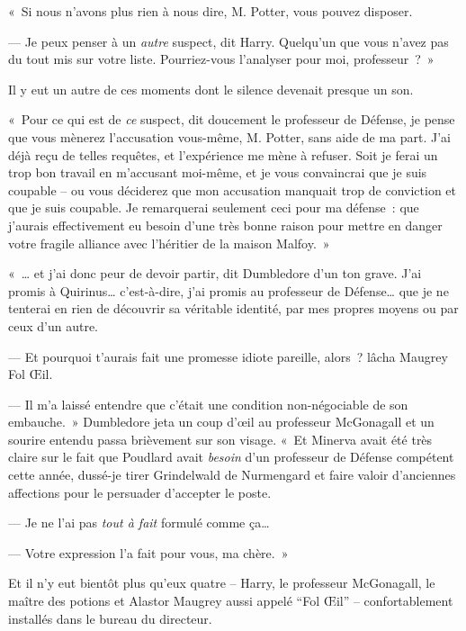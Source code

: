 «~Si nous n'avons plus rien à nous dire, M. Potter, vous pouvez disposer.

--- Je peux penser à un \emph{autre} suspect, dit Harry.
Quelqu'un que vous n'avez pas du tout mis sur votre liste.
Pourriez-vous l'analyser pour moi, professeur~?~»

Il y eut un autre de ces moments dont le silence devenait presque un son.

«~Pour ce qui est de \emph{ce} suspect, dit doucement le professeur de Défense, je pense que vous mènerez l'accusation vous-même, M. Potter, sans aide de ma part.
J'ai déjà reçu de telles requêtes, et l'expérience me mène à refuser.
Soit je ferai un trop bon travail en m'accusant moi-même, et je vous convaincrai que je suis coupable -- ou vous déciderez que mon accusation manquait trop de conviction et que je suis coupable.
Je remarquerai seulement ceci pour ma défense~: que j'aurais effectivement eu besoin d'une très bonne raison pour mettre en danger votre fragile alliance avec l'héritier de la maison Malfoy.~»


«~… et j'ai donc peur de devoir partir, dit Dumbledore d'un ton grave.
J'ai promis à Quirinus… c'est-à-dire, j'ai promis au professeur de Défense… que je ne tenterai en rien de découvrir sa véritable identité, par mes propres moyens ou par ceux d'un autre.

--- Et pourquoi t'aurais fait une promesse idiote pareille, alors~? lâcha Maugrey Fol Œil.

--- Il m'a laissé entendre que c'était une condition non-négociable de son embauche.~»
Dumbledore jeta un coup d'œil au professeur McGonagall et un sourire entendu passa brièvement sur son visage.
«~Et Minerva avait été très claire sur le fait que Poudlard avait \emph{besoin} d'un professeur de Défense compétent cette année, dussé-je tirer Grindelwald de Nurmengard et faire valoir d'anciennes affections pour le persuader d'accepter le poste.

--- Je ne l'ai pas \emph{tout à fait} formulé comme ça…

--- Votre expression l'a fait pour vous, ma chère.~»

Et il n'y eut bientôt plus qu'eux quatre -- Harry, le professeur McGonagall, le maître des potions et Alastor Maugrey aussi appelé “Fol Œil” -- confortablement installés dans le bureau du directeur.

